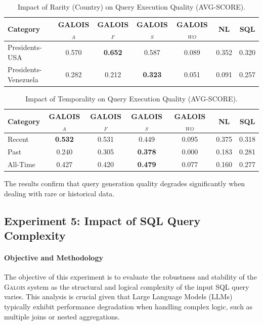 \begin{table}[H]
    \centering
    \caption{Impact of Rarity (Country) on Query Execution Quality (AVG-SCORE).}
    \label{tab:rarity_results}
    \small
    \begin{tabular}{lcccccc}
        \toprule
        \textbf{Category} & \textbf{GALOIS$_A$} & \textbf{GALOIS$_F$} & \textbf{GALOIS$_S$} & \textbf{GALOIS$_{WO}$} & \textbf{NL} & \textbf{SQL} \\
        \midrule
        Presidents-USA & 0.570 & \textbf{0.652} & 0.587 & 0.089 & 0.352 & 0.320 \\
        Presidents-Venezuela & 0.282 & 0.212 & \textbf{0.323} & 0.051 & 0.091 & 0.257 \\
        \bottomrule
    \end{tabular}
\end{table}

\begin{table}[H]
    \centering
    \caption{Impact of Temporality on Query Execution Quality (AVG-SCORE).}
    \label{tab:temporality_results}
    \small
    \begin{tabular}{lcccccc}
        \toprule
        \textbf{Category} & \textbf{GALOIS$_A$} & \textbf{GALOIS$_F$} & \textbf{GALOIS$_S$} & \textbf{GALOIS$_{WO}$} & \textbf{NL} & \textbf{SQL} \\
        \midrule
        Recent & \textbf{0.532} & 0.531 & 0.449 & 0.095 & 0.375 & 0.318 \\
        Past & 0.240 & 0.305 & \textbf{0.378} & 0.000 & 0.183 & 0.281 \\
        All-Time & 0.427 & 0.420 & \textbf{0.479} & 0.077 & 0.160 & 0.277 \\
        \bottomrule
    \end{tabular}
\end{table}

The results confirm that query generation quality degrades significantly when dealing with rare or historical data.

\subsection{Experiment 5: Impact of SQL Query Complexity}

\paragraph{Objective and Methodology}
The objective of this experiment is to evaluate the robustness and stability of the \textsc{Galois} system as the structural and logical complexity of the input SQL query varies. This analysis is crucial given that Large Language Models (LLMs) typically exhibit performance degradation when handling complex logic, such as multiple joins or nested aggregations.

